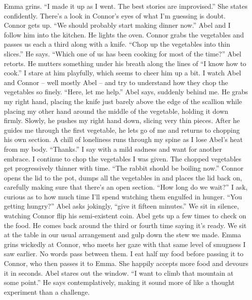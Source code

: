 \documentclass[openany, 12pt]{book}
\newcommand\tab[1][1cm]{\hspace*{#1}}
\begin{document}
\newline
\tab
Emma grins.  ``I made it up as I went. The best stories are improvised.'' She states confidently. There’s a look in Connor’s eyes of what I’m guessing is doubt. 
\newline
\tab
Connor gets up. ``We should probably start making dinner now.'' Abel and I follow him into the kitchen. He lights the oven. Connor grabs the vegetables and passes us each a third along with a knife. ``Chop up the vegetables into thin slices.'' He says.
\newline
\tab
``Which one of us has been cooking for most of the time?'' Abel retorts. He mutters something under his breath along the lines of ``I know how to cook.'' I stare at him playfully, which seems to cheer him up a bit. I watch Abel and Connor -- well mostly Abel -- and try to understand how they chop the vegetables so finely.
\newline
\tab
``Here, let me help.'' Abel says, suddenly behind me. He grabs my right hand, placing the knife just barely above the edge of the scallion while placing my other hand around the middle of the vegetable, holding it down firmly. Slowly, he pushes my right hand down, slicing very thin pieces. After he guides me through the first vegetable, he lets go of me and returns to chopping his own section. A chill of loneliness runs through my spine as I lose Abel’s heat from my body.
\newline
\tab
``Thanks.'' I say with a mild sadness and want for another embrace. I continue to chop the vegetables I was given. The chopped vegetables get progressively thinner with time.
\newline
\tab
``The rabbit should be boiling now.'' Connor opens the lid to the pot, dumps all the vegetables in and places the lid back on, carefully making sure that there’s an open section.
\newline
\tab
``How long do we wait?'' I ask, curious as to how much time I’ll spend watching them engulfed in hunger.
\newline
\tab
``You getting hungry?'' Abel asks jokingly, ``give it fifteen minutes.'' We sit in silence, watching Connor flip his semi-existent coin. Abel gets up a few times to check on the food. He comes back around the third or fourth time saying it’s ready. We sit at the table in our usual arrangement and gulp down the stew we made. Emma grins wickedly at Connor, who meets her gaze with that same level of smugness I saw earlier. No words pass between them. I eat half my food before passing it to Connor, who then passes it to Emma. She happily accepts more food and devours it in seconds. Abel stares out the window. ``I want to climb that mountain at some point.'' He says contemplatively, making it sound more of like a thought experiment than a challenge.
\end{document}
